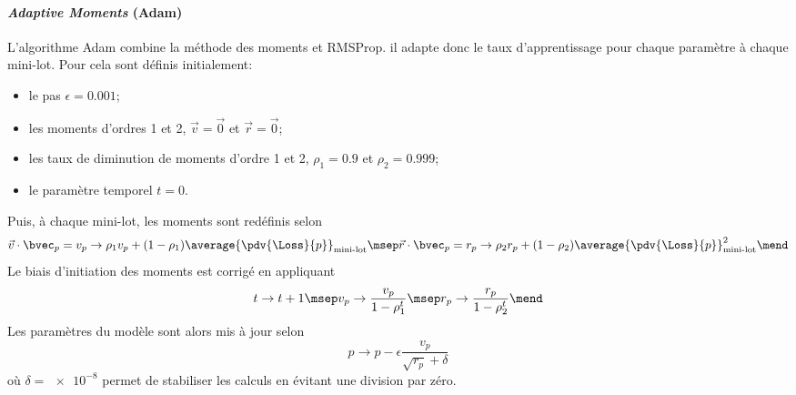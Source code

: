 \paragraph{\emph{Adaptive Moments} (Adam)} \cite{adam,DNN}
L'algorithme Adam
combine
la méthode des moments
et
RMSProp.
il adapte donc le taux d'apprentissage pour chaque paramètre à chaque mini-lot.
Pour cela sont définis initialement:
\begin{itemize}
\item le pas $\epsilon=\num{0.001}$;
\item les moments d'ordres 1 et 2, $\vec{v}=\vec{0}$ et $\vec{r}=\vec{0}$;
\item les taux de diminution de moments d'ordre 1 et 2, $\rho_1=\num{0.9}$ et $\rho_2=\num{0.999}$;
\item le paramètre temporel $t=0$.
\end{itemize}
Puis, à chaque mini-lot, les moments sont redéfinis selon
\begin{equation}
\vec{v}\cdot\bvec_p =
v_p \to \rho_1 v_p + (1-\rho_1) \average{\pdv{\Loss}{p}}_\text{mini-lot}
\msep
\vec{r}\cdot\bvec_p =
r_p \to \rho_2 r_p + (1-\rho_2) \average{\pdv{\Loss}{p}}_\text{mini-lot}^2
\mend
\end{equation}
Le biais d'initiation des moments est corrigé en appliquant
\begin{equation}
t \to t+1
\msep
v_p \to \frac{v_p}{1-\rho_1^t}
\msep
r_p \to \frac{r_p}{1-\rho_2^t}
\mend
\end{equation}
Les paramètres du modèle sont alors mis à jour selon
\begin{equation}
p \to p - \epsilon \frac{v_p}{\sqrt{r_p}+\delta}
\end{equation}
où
$\delta=\num{e-8}$ permet de stabiliser les calculs en évitant une division par zéro.
